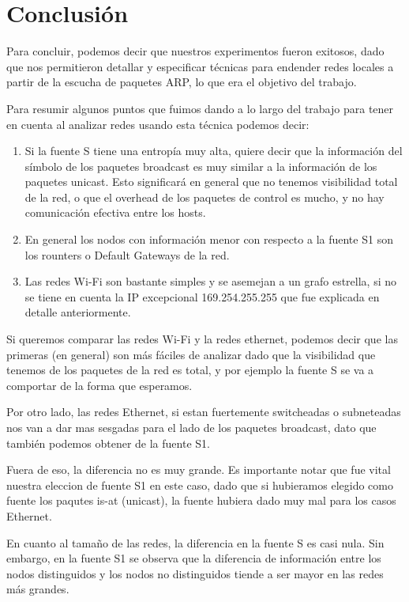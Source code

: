\section{Conclusión}

Para concluir, podemos decir que nuestros experimentos fueron exitosos, dado que nos permitieron detallar y especificar técnicas para endender redes locales a partir de la escucha de paquetes ARP, lo que era el objetivo del trabajo.

Para resumir algunos puntos que fuimos dando a lo largo del trabajo para tener en cuenta al analizar redes usando esta técnica podemos decir:

\begin{enumerate}
  \item Si la fuente S tiene una entropía muy alta, quiere decir que la información del símbolo de los paquetes broadcast es muy similar a la información de los paquetes unicast. Esto significará en general que no tenemos visibilidad total de la red, o que el overhead de los paquetes de control es mucho, y no hay comunicación efectiva entre los hosts.
  \item En general los nodos con información menor con respecto a la fuente S1 son los rounters o Default Gateways de la red.
  \item Las redes Wi-Fi son bastante simples y se asemejan a un grafo estrella, si no se tiene en cuenta la IP excepcional 169.254.255.255 que fue explicada en detalle anteriormente.
\end{enumerate}

Si queremos comparar las redes Wi-Fi y la redes ethernet, podemos decir que las primeras (en general) son más fáciles de analizar dado que la visibilidad que tenemos de los paquetes de la red es total, y por ejemplo la fuente S se va a comportar de la forma que esperamos.

Por otro lado, las redes Ethernet, si estan fuertemente switcheadas o subneteadas nos van a dar mas sesgadas para el lado de los paquetes broadcast, dato que también podemos obtener de la fuente S1.

Fuera de eso, la diferencia no es muy grande. Es importante notar que fue vital nuestra eleccion de fuente S1 en este caso, dado que si hubieramos elegido como fuente los paqutes is-at (unicast), la fuente hubiera dado muy mal para los casos Ethernet.


En cuanto al tamaño de las redes, la diferencia en la fuente S es casi nula. Sin embargo, en la fuente S1 se observa que la diferencia de información entre los nodos distinguidos y los nodos no distinguidos tiende a ser mayor en las redes más grandes.


